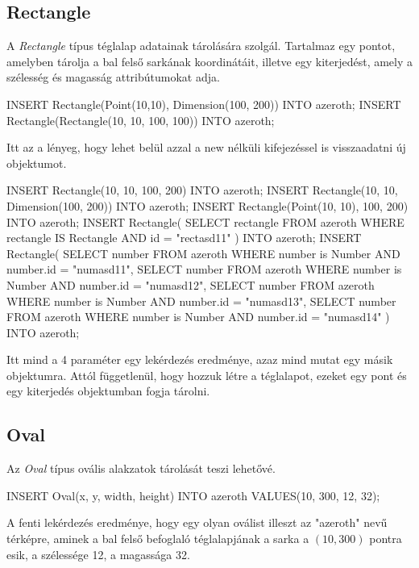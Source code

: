 \subsection{Rectangle}

A \textit{Rectangle} típus téglalap adatainak tárolására szolgál. Tartalmaz egy pontot, amelyben tárolja a bal felső sarkának koordinátáit, illetve egy kiterjedést, amely a szélesség és magasság attribútumokat adja.

\begin{sql}
INSERT Rectangle(Point(10,10), Dimension(100, 200)) INTO azeroth;
INSERT Rectangle(Rectangle(10, 10, 100, 100)) INTO azeroth;
\end{sql}

Itt az a lényeg, hogy lehet belül azzal a new nélküli kifejezéssel is visszaadatni új objektumot.

\begin{sql}
INSERT Rectangle(10, 10, 100, 200) INTO azeroth;
INSERT Rectangle(10, 10, Dimension(100, 200)) INTO azeroth;
INSERT Rectangle(Point(10, 10), 100, 200) INTO azeroth;
INSERT Rectangle(
    SELECT rectangle FROM azeroth
    WHERE rectangle IS Rectangle AND id = "rectasd11"
) INTO azeroth;
INSERT Rectangle(
    SELECT number FROM azeroth
    WHERE number is Number AND number.id = "numasd11",
    SELECT number FROM azeroth
    WHERE number is Number AND number.id = "numasd12",
    SELECT number FROM azeroth
    WHERE number is Number AND number.id = "numasd13",
    SELECT number FROM azeroth
    WHERE number is Number AND number.id = "numasd14"
) INTO azeroth;
\end{sql}

Itt mind a 4 paraméter egy lekérdezés eredménye, azaz mind mutat egy másik objektumra.
Attól függetlenül, hogy hozzuk létre a téglalapot, ezeket egy pont és egy kiterjedés objektumban fogja tárolni.

\subsection{Oval}

Az \textit{Oval} típus ovális alakzatok tárolását teszi lehetővé. 

\begin{sql}
INSERT Oval(x, y, width, height) INTO azeroth 
VALUES(10, 300, 12, 32);
\end{sql}

A fenti lekérdezés eredménye, hogy egy olyan oválist illeszt az "azeroth" nevű térképre, aminek a bal felső befoglaló téglalapjának a sarka a $(10, 300)$ pontra esik, a szélessége 12, a magassága 32. 

